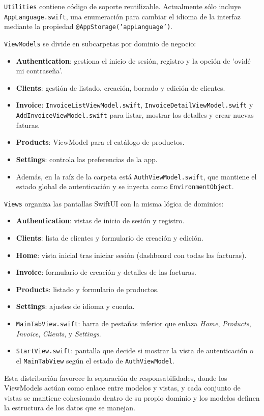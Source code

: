 \begin{large}
\texttt{Utilities} contiene código de soporte reutilizable. Actualmente sólo incluye \texttt{AppLanguage.swift}, una enumeración para cambiar el idioma de la interfaz mediante la propiedad \texttt{@AppStorage('appLanguage')}.

\texttt{ViewModels} se divide en subcarpetas por dominio de negocio:
\begin{itemize}
  \item \textbf{Authentication}: gestiona el inicio de sesión, registro y la opción de 'ovidé mi contraseña'.
  \item \textbf{Clients}: gestión de listado, creación, borrado y edición de clientes.
  \item \textbf{Invoice}: \texttt{InvoiceListViewModel.swift}, \texttt{InvoiceDetailViewModel.swift} y \texttt{AddInvoiceViewModel.swift} para listar, mostrar los detalles y crear nuevas faturas.
  \item \textbf{Products}: ViewModel para el catálogo de productos.
  \item \textbf{Settings}: controla las preferencias de la app.
  \item Además, en la raíz de la carpeta está \texttt{AuthViewModel.swift}, que mantiene el estado global de autenticación y se inyecta como \texttt{EnvironmentObject}.
\end{itemize}

\texttt{Views} organiza las pantallas SwiftUI con la misma lógica de dominios:
\begin{itemize}
  \item \textbf{Authentication}: vistas de inicio de sesión y registro.
  \item \textbf{Clients}: lista de clientes y formulario de creación y edición.
  \item \textbf{Home}: vista inicial tras iniciar sesión (dashboard con todas las facturas).
  \item \textbf{Invoice}: formulario de creación y detalles de las facturas.
  \item \textbf{Products}: listado y formulario de productos.
  \item \textbf{Settings}: ajustes de idioma y cuenta.
  \item \texttt{MainTabView.swift}: barra de pestañas inferior que enlaza \textit{Home}, \textit{Products}, \textit{Invoice}, \textit{Clients}, y \textit{Settings}.
  \item \texttt{StartView.swift}: pantalla que decide si mostrar la vista de autenticación o el \texttt{MainTabView} según el estado de \texttt{AuthViewModel}.
\end{itemize}

Esta distribución favorece la separación de responsabilidades, donde los 
ViewModels actúan como enlace entre modelos y vistas, y cada conjunto de vistas se mantiene cohesionado dentro de su propio dominio y los modelos definen la estructura de los datos que se manejan.

\end{large}

